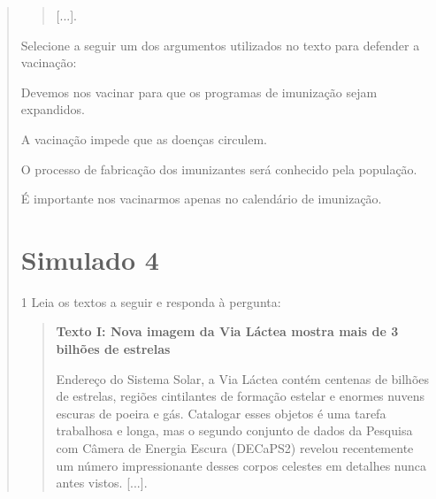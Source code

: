 \begin{quote}
\begin{quote}
{[}...{]}.

\end{quote}

Selecione a seguir um dos argumentos utilizados no texto para defender a
vacinação:

\begin{escolha}
\item Devemos nos vacinar para que os programas de imunização sejam expandidos.

\item A vacinação impede que as doenças circulem.

\item O processo de fabricação dos imunizantes será conhecido pela população.

\item É importante nos vacinarmos apenas no calendário de imunização.
\end{escolha}


\chapter{Simulado 4}

\num{1} Leia os textos a seguir e responda à pergunta:

\begin{quote}
\textbf{Texto I: Nova imagem da Via Láctea mostra mais de 3 bilhões de
estrelas}

Endereço do Sistema Solar, a Via Láctea contém centenas de bilhões de
estrelas, regiões cintilantes de formação estelar e enormes nuvens
escuras de poeira e gás. Catalogar esses objetos é uma tarefa trabalhosa
e longa, mas o segundo conjunto de dados da Pesquisa com Câmera de
Energia Escura (DECaPS2) revelou recentemente um número impressionante
desses corpos celestes em detalhes nunca antes vistos. {[}...{]}.


\end{quote}
\end{quote}
